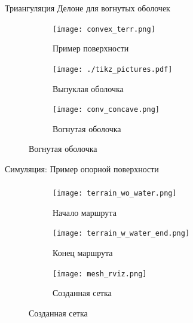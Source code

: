 \begin{frame}[t]{Триангуляция Делоне для вогнутых оболочек}
    \begin{figure}[H]
        \begin{subfigure}[t]{0.3\textwidth}
            \centering\texttt{[image: convex\_terr.png]}
            \caption*{Пример поверхности}
        \end{subfigure}
        \hfill
        \begin{subfigure}[t]{0.33\textwidth}
            \centering
            \centering\texttt{[image: ./tikz\_pictures.pdf]}
            \caption*{Выпуклая оболочка}
        \end{subfigure}
        \hfill
        \begin{subfigure}[t]{0.33\textwidth}
            \centering\texttt{[image: conv\_concave.png]}
            \caption*{Вогнутая оболочка}
        \end{subfigure}

    \end{figure}
\end{frame}


\begin{frame}[t]{Симуляция: Пример опорной поверхности}
    \framesubtitle{}
    \begin{figure}[H]
        \begin{subfigure}[t]{0.36\textwidth}
            \centering\texttt{[image: terrain\_wo\_water.png]}
            \caption*{Начало маршрута}
        \end{subfigure}
        \begin{subfigure}[t]{0.36\textwidth}
            \centering\texttt{[image: terrain\_w\_water\_end.png]}
            \caption*{Конец маршрута}
        \end{subfigure}
        \begin{subfigure}[t]{0.26\textwidth}
            \centering\texttt{[image: mesh\_rviz.png]}
            \caption*{Созданная сетка}
        \end{subfigure}
    \end{figure}
\end{frame}

